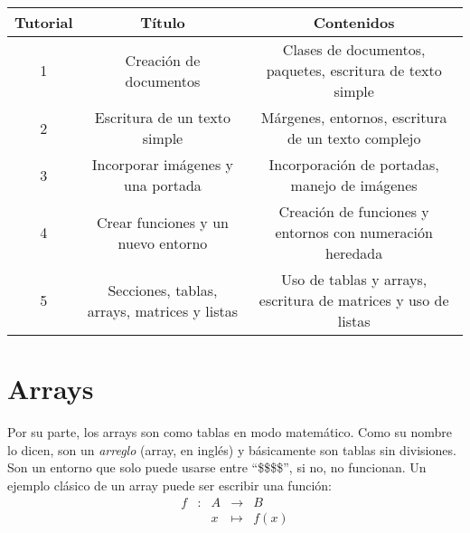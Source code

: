 \documentclass{article}
\begin{document}
	\begin{center}	%
	\begin{tabular}{c | c | c}
		Tutorial	&	Título								&	Contenidos	\\ \hline
		1		&	Creación de documentos					&	Clases de documentos, paquetes, escritura de texto simple	\\ \hline
		2		&	Escritura de un texto simple				&	Márgenes, entornos, escritura de un texto complejo				\\ \hline
		3		&	Incorporar imágenes y una portada			&	Incorporación de portadas, manejo de imágenes	\\ \hline
		4		&	Crear funciones y un nuevo entorno			&	Creación de funciones y entornos con numeración heredada	\\ \hline
		5		&	Secciones, tablas, arrays, matrices y listas	&	Uso de tablas y arrays, escritura de matrices y uso de listas
	\end{tabular}
	\end{center}

\section*{Arrays}
Por su parte, los arrays son como tablas en modo matemático. Como su nombre lo dicen, son un \textit{arreglo} (array, en inglés) y básicamente son tablas sin divisiones. Son un entorno que solo puede usarse entre ``\$\$\$\$'', si no, no funcionan. Un ejemplo clásico de un array puede ser escribir una función:
	$$\begin{array}{ccccl}	%
		f	&	:	&	A	&	\to		&	B	\\
			&		&	x	&	\mapsto	&	f(x)
	\end{array}$$
\end{document}
